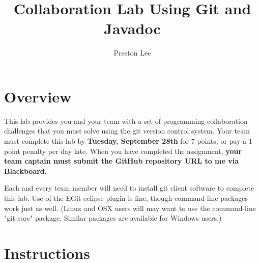 \documentclass{article}
\author{Preston Lee}
\title{Collaboration Lab Using Git and Javadoc}
\begin{document}

\maketitle

\section{Overview}
This lab provides you and your team with a set of programming collaboration challenges that you must solve using the git version control system.
\footnotemark{} Your team must complete this lab by {\bf Tuesday, September 28th} for 7 points, or pay a 1 point penalty per day late. When you have completed the assignment, {\bf your team captain must submit the GitHub repository URL to me via Blackboard}.

Each and every team member will need to install git client software to complete this lab. Use of the EGit eclipse plugin is fine, though command-line packages work just as well. (Linux and OSX users will may want to use the command-line "git-core" package. Similar packages are available for Windows users.)

\section{Instructions}
\end{document}

